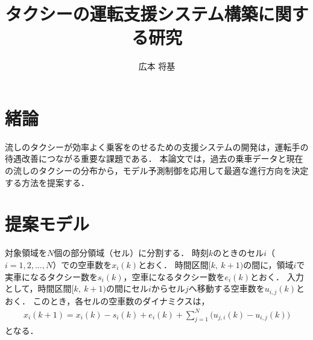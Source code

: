 \documentclass[a4j,9pt,twocolumn]{paper}
\title{タクシーの運転支援システム構築に関する研究}	%
\author{広本 将基}		%
\begin{document}
\absttitle		%

\section{緒論}
\par
流しのタクシーが効率よく乗客をのせるための支援システムの開発は，運転手の待遇改善につながる重要な課題である．
本論文では，過去の乗車データと現在の流しのタクシーの分布から，モデル予測制御を応用して最適な進行方向を決定する方法を提案する．

\section{提案モデル}
\par
対象領域を$N$個の部分領域（セル）に分割する．
時刻$k$のときのセル$i$（$i = 1, 2, \ldots, N$）での空車数を$x_i(k)$とおく．
時間区間$[k,\ k+1)$の間に，領域$i$で実車になるタクシー数を$s_i(k)$，空車になるタクシー数を$e_i(k)$とおく．
入力として，時間区間$[k,\ k+1)$の間にセル$i$からセル$j$へ移動する空車数を$u_{i, j}(k)$とおく．
このとき，各セルの空車数のダイナミクスは，
\begin{align}
 x_i(k+1) = x_i(k)-s_i(k)+e_i(k)+\sum_{j=1}^{N}\bigg(u_{j,i}(k)-u_{i,j}(k) \bigg) \label{eq:x}
\end{align}
となる．
\end{document}
